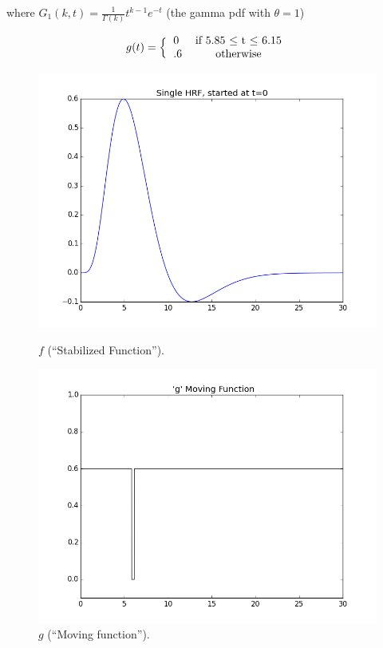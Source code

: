 \documentclass[11pt]{article}
\begin{document}
where $G_1(k,t) =\frac{1}{\Gamma(k)} t^{k-1} e^{-t}$ (the gamma pdf with 
$\theta =1$)

\begin{equation} \label{eq:step}
 g(t)=\Big \{ \begin{tabular}{l c}
 		0  & if  5.85 $\leq$ t $\leq$ 6.15\\
 		.6  & otherwise \\
 		\end{tabular} \end{equation}
 		
 		
\begin{figure}[ht]
\centering
\begin{minipage}[b]{0.45\linewidth}
	\centering
	\includegraphics[width=.8\linewidth]{images/hrf_pattern.png} 
	\caption{$f$ (``Stabilized Function'').}
	\label{fig:f}
\end{minipage}	
\quad
\begin{minipage}[b]{0.45\linewidth}
	\centering
		\includegraphics[width=.8\linewidth]{images/play.png} 
	\caption{$g$ (``Moving function'').}
	\label{fig:g}
\end{minipage}
\end{figure}
\end{document}

